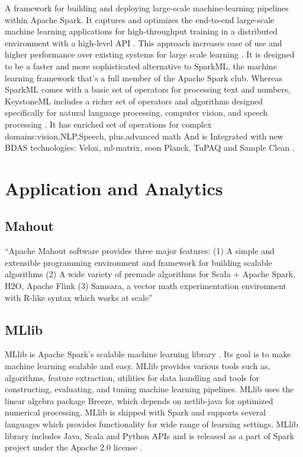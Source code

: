     A framework for building and deploying large-scale
    machine-learning pipelines within Apache Spark. It captures and
    optimizes the end-to-end large-scale machine learning applications
    for high-throughput training in a distributed environment with a
    high-level API \cite{sparks2016keystoneml}. This approach
    increases ease of use and higher performance over existing systems
    for large scale learning \cite{sparks2016keystoneml}. It is
    designed to be a faster and more sophisticated alternative to
    SparkML, the machine learning framework that’s a full member of
    the Apache Spark club. Whereas SparkML comes with a basic set of
    operators for processing text and numbers, KeystoneML includes a
    richer set of operators and algorithms designed specifically for
    natural language processing, computer vision, and speech
    processing \cite{building}. It has enriched set of operations for
    complex domains:vision,NLP,Speech, plus,advanced math And is
    Integrated with new BDAS technologies: Velox, ml-matrix, soon
    Planck, TuPAQ and Sample Clean \cite{spark}.

\section{Application and Analytics}
\label{S:o-application}

\subsection{Mahout \cite{www-mahout}}

    ``Apache Mahout software provides three major features:
    (1) A simple and extensible programming environment and framework
    for building scalable algorithms
    (2) A wide variety of premade algorithms for Scala + Apache Spark,
    H2O, Apache Flink
    (3) Samsara, a vector math experimentation environment with R-like
    syntax which works at scale''


\subsection{MLlib}

    MLlib is Apache Spark’s scalable machine learning library
    \cite{www-mllib}. Its goal is to make machine learning scalable
    and easy. MLlib provides various tools such as, algorithms,
    feature extraction, utilities for data handling and tools for
    constructing, evaluating, and tuning machine learning
    pipelines. MLlib uses the linear algebra package Breeze, which
    depends on netlib-java for optimized numerical processing. MLlib
    is shipped with Spark and supports several languages which
    provides functionality for wide range of learning settings. MLlib
    library includes Java, Scala and Python APIs and is released as a
    part of Spark project under the Apache 2.0 license
    \cite{MLlib-article}.

